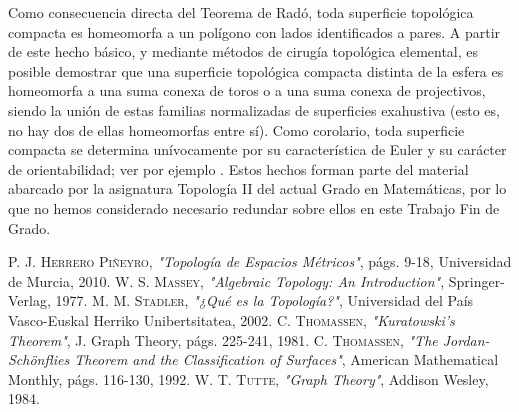 \documentclass[12pt,a4paper,oldfontcommands]{memoir}
\begin{document}
\begin{remark} Como consecuencia directa del Teorema de Radó, toda superficie topológica compacta es homeomorfa a un polígono con lados identificados a pares. A partir de este hecho básico, y mediante métodos de cirugía topológica elemental, es posible demostrar que una superficie topológica compacta distinta de la esfera es homeomorfa a una suma conexa de toros o a una suma conexa de projectivos, siendo la unión de estas familias normalizadas de superficies exahustiva (esto es, no hay dos de ellas homeomorfas entre sí). Como corolario, toda superficie compacta se determina unívocamente por su característica de Euler y su carácter de orientabilidad; ver por ejemplo \cite{Massey}. Estos hechos forman parte del material abarcado por la asignatura Topología II del actual Grado en Matemáticas, por lo que no hemos considerado necesario redundar sobre ellos en este Trabajo Fin de Grado.
\end{remark}



\begin{thebibliography}{10}

	 \textsc{P. J. Herrero Piñeyro},
	\textit{"Topología de Espacios Métricos"}, págs. 9-18, Universidad de Murcia, 2010.
	 \textsc{W. S. Massey},
	\textit{"Algebraic Topology: An Introduction"}, Springer-Verlag, 1977.
	 \textsc{M. M. Stadler},
	\textit{"¿Qué es la Topología?"}, Universidad del País Vasco-Euskal Herriko Unibertsitatea, 2002.
	 \textsc{C. Thomassen},
	\textit{"Kuratowski's Theorem"}, J. Graph Theory, págs. 225-241, 1981.
	 \textsc{C. Thomassen},
	\textit{"The Jordan-Schönflies Theorem and the Classification of Surfaces"}, American Mathematical Monthly, págs. 116-130, 1992.
	 \textsc{W. T. Tutte},
	\textit{"Graph Theory"}, Addison Wesley, 1984.
	
\end{thebibliography}
\end{document}
